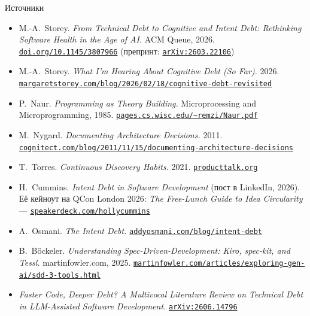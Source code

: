 \documentclass[11pt, aspectratio=169]{beamer}
\begin{document}
\begin{frame}{Источники}
  \scriptsize
  \begin{itemize}
    \setlength\itemsep{0.2em}

    \item M.-A.\ Storey. \textit{From Technical Debt to Cognitive and Intent
          Debt: Rethinking Software Health in the Age of AI.}
          ACM Queue, 2026.
          \href{https://doi.org/10.1145/3807966}{\texttt{doi.org/10.1145/3807966}}
          \textcolor{mutedText}{(препринт:
          \href{https://arxiv.org/abs/2603.22106}{\texttt{arXiv:2603.22106}})}

    \item M.-A.\ Storey. \textit{What I'm Hearing About Cognitive Debt (So Far).}
          2026.
          \href{https://margaretstorey.com/blog/2026/02/18/cognitive-debt-revisited/}{\texttt{margaretstorey.com/blog/2026/02/18/cognitive-debt-revisited}}

    \item P.\ Naur. \textit{Programming as Theory Building.}
          Microprocessing and Microprogramming, 1985.
          \href{https://pages.cs.wisc.edu/~remzi/Naur.pdf}{\texttt{pages.cs.wisc.edu/\textasciitilde remzi/Naur.pdf}}

    \item M.\ Nygard. \textit{Documenting Architecture Decisions.} 2011.
          \href{https://cognitect.com/blog/2011/11/15/documenting-architecture-decisions}{\texttt{cognitect.com/blog/2011/11/15/documenting-architecture-decisions}}

    \item T.\ Torres. \textit{Continuous Discovery Habits.} 2021.
          \href{https://www.producttalk.org/}{\texttt{producttalk.org}}

    \item H.\ Cummins. \textit{Intent Debt in Software Development}
          \textcolor{mutedText}{(пост в LinkedIn, 2026)}. Её кейноут на QCon London 2026:
          \textit{The Free-Lunch Guide to Idea Circularity} ---
          \href{https://speakerdeck.com/hollycummins/the-free-lunch-guide-to-idea-circularity}{\texttt{speakerdeck.com/hollycummins}}

    \item A.\ Osmani. \textit{The Intent Debt.}
          \href{https://addyosmani.com/blog/intent-debt/}{\texttt{addyosmani.com/blog/intent-debt}}

    \item B.\ Böckeler. \textit{Understanding Spec-Driven-Development: Kiro,
          spec-kit, and Tessl.} martinfowler.com, 2025.
          \href{https://martinfowler.com/articles/exploring-gen-ai/sdd-3-tools.html}{\texttt{martinfowler.com/articles/exploring-gen-ai/sdd-3-tools.html}}

    \item \textit{Faster Code, Deeper Debt? A Multivocal Literature Review on
          Technical Debt in LLM-Assisted Software Development.}
          \href{https://arxiv.org/abs/2606.14796}{\texttt{arXiv:2606.14796}}

  \end{itemize}
\end{frame}
\end{document}
